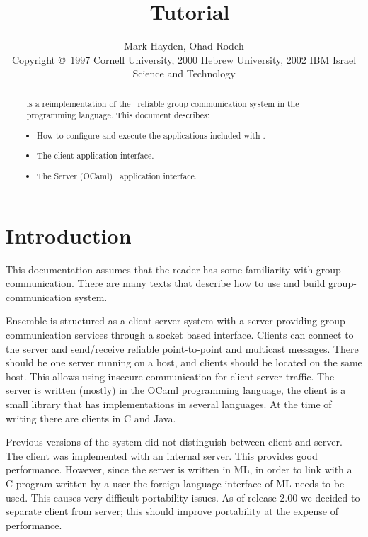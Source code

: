 \documentclass[11pt]{article}
\title{\ensemble\ Tutorial}
\author{Mark Hayden, Ohad Rodeh \\
\small{Copyright \copyright\ 1997 Cornell University,
                             2000 Hebrew  University,
                             2002 IBM Israel Science and Technology }
}
\begin{document}
\maketitle

\begin{abstract}
\ensemble\ is a reimplementation of the \horus\ reliable group communication
system in the \caml\ programming language.  This document describes:
\begin{itemize}
\item
How to configure and execute the applications included with \ensemble.
\item
The client application interface.
\item
The Server (OCaml) \ensemble\ application interface.
\end{itemize}
\end{abstract}

\newpage
\tableofcontents
\newpage

\section{Introduction}
This documentation assumes that the reader has some familiarity with group
communication. There are many texts that describe how to use and build
group-communication system.

Ensemble is structured as a client-server system with a server
providing group-communication services through a socket based
interface. Clients can connect to the server and send/receive reliable
point-to-point and multicast messages. There should be one server
running on a host, and clients should be located on the same
host. This allows using insecure communication for client-server
traffic.  The server is written (mostly) in the OCaml programming
language, the client is a small library that has
implementations in several languages. At the time of writing there are
clients in C and Java.

Previous versions of the system did not distinguish between client and
server. The client was implemented with an internal server. This
provides good performance. However, since the server is written in ML,
in order to link with a C program written by a user the
foreign-language interface of ML needs to be used. This causes very
difficult portability issues. As of release 2.00 we decided to
separate client from server; this should improve portability at the
expense of performance. 


\end{document}
